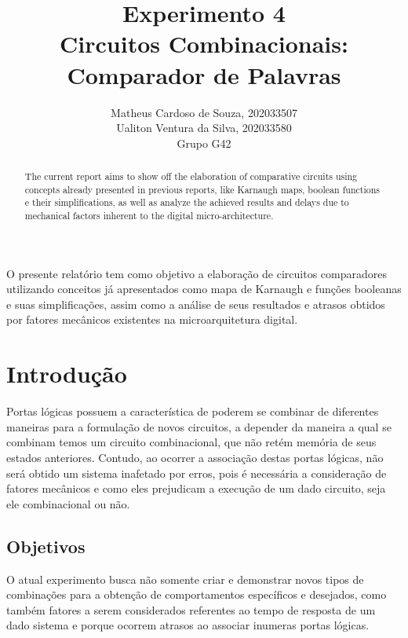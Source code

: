 \documentclass[12pt]{article}
\title{Experimento 4\\
Circuitos Combinacionais: Comparador de Palavras}
\author{Matheus Cardoso de Souza, 202033507\\
        Ualiton Ventura da Silva, 202033580\\
        Grupo G42
}
\begin{document}
\maketitle

 \begin{abstract}
   The current report aims to show off the elaboration of comparative circuits
   using concepts already presented in previous reports, like Karnaugh maps,
   boolean functions e their simplifications, as well as analyze the achieved
   results and delays due to mechanical factors inherent to the digital
   micro-architecture.
 \end{abstract}

 \begin{resumo}
   O presente relatório tem como objetivo a elaboração de circuitos comparadores
   utilizando conceitos já apresentados como mapa de Karnaugh e funções
   booleanas e suas simplificações, assim como a análise de seus resultados e
   atrasos obtidos por fatores mecânicos existentes na microarquitetura digital.
 \end{resumo}


\section{Introdução}
\label{sec:Introducao}


Portas lógicas possuem a característica de poderem se combinar de diferentes
maneiras para a formulação de novos circuitos, a depender da maneira a qual se
combinam temos um circuito combinacional, que não retém memória de seus estados
anteriores. Contudo, ao ocorrer a associação destas portas lógicas, não será
obtido um sistema inafetado por erros, pois é necessária a consideração de
fatores mecânicos e como eles prejudicam a execução de um dado circuito, seja
ele combinacional ou não.

\subsection{Objetivos}
\label{sec:Objetivos}

O atual experimento busca não somente criar e demonstrar novos tipos de
combinações para a obtenção de comportamentos específicos e desejados, como
também fatores a serem considerados referentes ao tempo de resposta de um dado
sistema e porque ocorrem atrasos ao associar inumeras portas lógicas.
\end{document}
